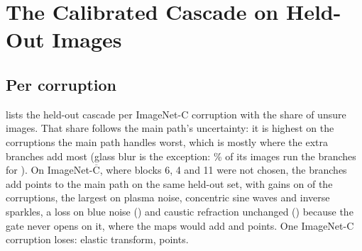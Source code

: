 \documentclass{article}
\begin{document}
\section{The Calibrated Cascade on Held-Out Images}
\label{app:exit}
\subsection{Per corruption}
 lists the held-out cascade per ImageNet-C corruption with the share of unsure images. That share follows the main path's uncertainty: it is highest on the corruptions the main path handles worst, which is mostly where the extra branches add most (glass blur is the exception: \% of its images run the branches for ). On ImageNet-$\overline{\text{C}}$, where blocks 6, 4 and 11 were not chosen, the branches add  points to the main path on the same held-out set, with gains on  of the  corruptions, the largest on plasma noise, concentric sine waves and inverse sparkles, a loss on blue noise () and caustic refraction unchanged () because the gate never opens on it, where the maps would add  and  points. One ImageNet-C corruption loses: elastic transform,  points.
\end{document}
